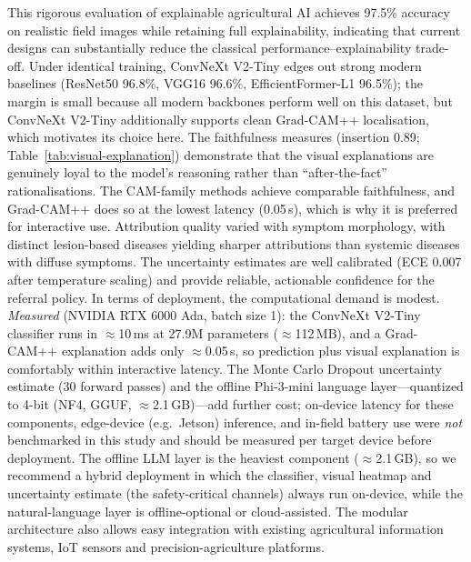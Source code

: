 \documentclass[pdflatex,sn-mathphys-num]{sn-jnl}%
\begin{document}
This rigorous evaluation of explainable agricultural AI achieves 97.5\% accuracy on realistic field images while retaining full explainability, indicating that current designs can substantially reduce the classical performance--explainability trade-off. Under identical training, ConvNeXt V2-Tiny edges out strong modern baselines (ResNet50 96.8\%, VGG16 96.6\%, EfficientFormer-L1 96.5\%); the margin is small because all modern backbones perform well on this dataset, but ConvNeXt V2-Tiny additionally supports clean Grad-CAM++ localisation, which motivates its choice here.
The faithfulness measures (insertion 0.89; Table~\ref{tab:visual-explanation}) demonstrate that the visual explanations are genuinely loyal to the model's reasoning rather than ``after-the-fact'' rationalisations. The CAM-family methods achieve comparable faithfulness, and Grad-CAM++ does so at the lowest latency (0.05\,s), which is why it is preferred for interactive use. Attribution quality varied with symptom morphology, with distinct lesion-based diseases yielding sharper attributions than systemic diseases with diffuse symptoms. The uncertainty estimates are well calibrated (ECE 0.007 after temperature scaling) and provide reliable, actionable confidence for the referral policy.
In terms of deployment, the computational demand is modest. \emph{Measured} (NVIDIA RTX 6000 Ada, batch size 1): the ConvNeXt V2-Tiny classifier runs in $\approx$10\,ms at 27.9M parameters ($\approx$112\,MB), and a Grad-CAM++ explanation adds only $\approx$0.05\,s, so prediction plus visual explanation is comfortably within interactive latency. The Monte Carlo Dropout uncertainty estimate (30 forward passes) and the offline Phi-3-mini language layer---quantized to 4-bit (NF4, GGUF, $\approx$2.1\,GB)---add further cost; on-device latency for these components, edge-device (e.g.\ Jetson) inference, and in-field battery use were \emph{not} benchmarked in this study and should be measured per target device before deployment. The offline LLM layer is the heaviest component ($\approx$2.1\,GB), so we recommend a hybrid deployment in which the classifier, visual heatmap and uncertainty estimate (the safety-critical channels) always run on-device, while the natural-language layer is offline-optional or cloud-assisted. The modular architecture also allows easy integration with existing agricultural information systems, IoT sensors and precision-agriculture platforms.
\end{document}
